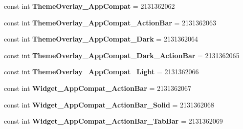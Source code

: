 \begin{DoxyCompactItemize}
const int {\bfseries Theme\+Overlay\+\_\+\+App\+Compat} = 2131362062
\item 
\mbox{\label{class_sample_app_1_1_droid_1_1_resource_1_1_style_a15207f2adaf902e04f04ec647bdaeaf9}} 
const int {\bfseries Theme\+Overlay\+\_\+\+App\+Compat\+\_\+\+Action\+Bar} = 2131362063
\item 
\mbox{\label{class_sample_app_1_1_droid_1_1_resource_1_1_style_a049f5fa08d3e1114863cf6c65bf664fb}} 
const int {\bfseries Theme\+Overlay\+\_\+\+App\+Compat\+\_\+\+Dark} = 2131362064
\item 
\mbox{\label{class_sample_app_1_1_droid_1_1_resource_1_1_style_a7238e57afc2a7528297b08b40c400847}} 
const int {\bfseries Theme\+Overlay\+\_\+\+App\+Compat\+\_\+\+Dark\+\_\+\+Action\+Bar} = 2131362065
\item 
\mbox{\label{class_sample_app_1_1_droid_1_1_resource_1_1_style_a0328f15c7c5e32a395d5f4631b601e3e}} 
const int {\bfseries Theme\+Overlay\+\_\+\+App\+Compat\+\_\+\+Light} = 2131362066
\item 
\mbox{\label{class_sample_app_1_1_droid_1_1_resource_1_1_style_aa458e1e0e5e34f9e80db8d12544961c0}} 
const int {\bfseries Widget\+\_\+\+App\+Compat\+\_\+\+Action\+Bar} = 2131362067
\item 
\mbox{\label{class_sample_app_1_1_droid_1_1_resource_1_1_style_a9711e0008105536702853b69ef207a8f}} 
const int {\bfseries Widget\+\_\+\+App\+Compat\+\_\+\+Action\+Bar\+\_\+\+Solid} = 2131362068
\item 
\mbox{\label{class_sample_app_1_1_droid_1_1_resource_1_1_style_adf72ae93f981f4948a7c6ab08b5ee703}} 
const int {\bfseries Widget\+\_\+\+App\+Compat\+\_\+\+Action\+Bar\+\_\+\+Tab\+Bar} = 2131362069
\item 
\mbox{\label{class_sample_app_1_1_droid_1_1_resource_1_1_style_ac287594e6927dc8942451588e77ed319}} 

\end{DoxyCompactItemize}
